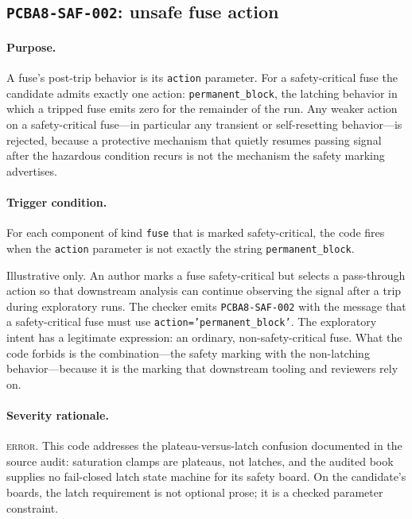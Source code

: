 \subsection{\texttt{PCBA8-SAF-002}: unsafe fuse action}\label{ch07:sub:saf002}

\paragraph{Purpose.} A fuse's post-trip behavior is its \texttt{action} parameter. For a safety-critical fuse the candidate admits exactly one action: \texttt{permanent\_block}, the latching behavior in which a tripped fuse emits zero for the remainder of the run. Any weaker action on a safety-critical fuse---in particular any transient or self-resetting behavior---is rejected, because a protective mechanism that quietly resumes passing signal after the hazardous condition recurs is not the mechanism the safety marking advertises.

\paragraph{Trigger condition.} For each component of kind \texttt{fuse} that is marked safety-critical, the code fires when the \texttt{action} parameter is not exactly the string \texttt{permanent\_block}.

\begin{example}\label{ch07:ex:saf002}
Illustrative only. An author marks a fuse safety-critical but selects a pass-through action so that downstream analysis can continue observing the signal after a trip during exploratory runs. The checker emits \texttt{PCBA8-SAF-002} with the message that a safety-critical fuse must use \texttt{action='permanent\_block'}. The exploratory intent has a legitimate expression: an ordinary, non-safety-critical fuse. What the code forbids is the combination---the safety marking with the non-latching behavior---because it is the marking that downstream tooling and reviewers rely on.
\end{example}

\paragraph{Severity rationale.} \textsc{error}. This code addresses the plateau-versus-latch confusion documented in the source audit: saturation clamps are plateaus, not latches, and the audited book supplies no fail-closed latch state machine for its safety board. On the candidate's boards, the latch requirement is not optional prose; it is a checked parameter constraint.

